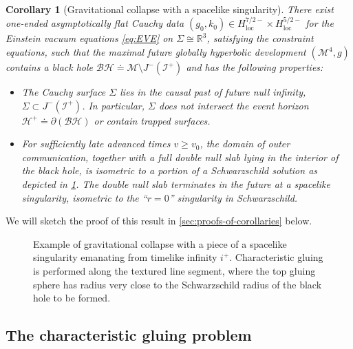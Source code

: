 \documentclass[10pt]{article}
\numberwithin{equation}{section}
\theoremstyle{plain}
\newtheorem{cor}{Corollary}
\theoremstyle{definition}
\renewcommand{\Bbb}{\mathbb}
\begin{document}
\begin{cor}[Gravitational collapse with a spacelike singularity]\label{cor:spacelike}
      There exist one-ended asymptotically flat Cauchy data $(g_0,k_0)\in H^{7/2-}_\mathrm{loc}\times H^{5/2-}_\mathrm{loc}$ for the Einstein vacuum equations \eqref{eq:EVE} on $\Sigma\cong\Bbb R^3$, satisfying the constraint equations, such that the maximal future globally hyperbolic development $(\mathcal M^4,g)$ contains a black hole $\mathcal{BH}\doteq \mathcal M\setminus J^-(\mathcal I^+)$ and has the following properties: 
 \begin{itemize}
     \item The Cauchy surface $\Sigma$ lies in the causal past of future null infinity, $\Sigma\subset J^-(\mathcal I^+)$. In particular, $\Sigma$ does not intersect the event horizon $\mathcal H^+\doteq\partial(\mathcal{BH})$ or contain trapped surfaces. 
     \item For sufficiently late advanced times $v\ge v_0$, the domain of outer communication, together with a full double null slab lying in the interior of the black hole, is isometric to a portion of a Schwarzschild solution as depicted in \cref{fig:spacelike-singularity}. The double null slab terminates in the future at a spacelike singularity, isometric to the ``$r=0$'' singularity in Schwarzschild. 
 \end{itemize}
\end{cor}

We will sketch the proof of this result in \cref{sec:proofs-of-corollaries} below. 

 \begin{figure}[ht]
\centering{
\def\svgwidth{18pc}
}
\caption{Example of gravitational collapse with a piece of a spacelike singularity emanating from timelike infinity $i^+$. Characteristic gluing is performed along the textured line segment, where the top gluing sphere has radius very close to the Schwarzschild radius of the black hole to be formed.}
\label{fig:spacelike-singularity}
\end{figure}

\subsection{The characteristic gluing problem}\label{sec:previous-work}
\end{document}
